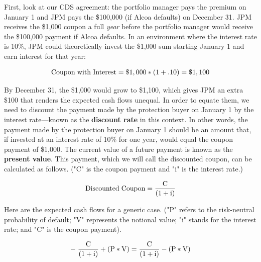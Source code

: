 \documentclass[article]{jss}
\begin{document}
First, look at our CDS agreement: the portfolio manager pays the premium on January 1 and JPM pays the \$100,000 (if Alcoa defaults) on December 31. JPM receives the \$1,000 coupon a full \emph{year} before the portfolio manager would receive the \$100,000 payment if Alcoa defaults. In an environment where the interest rate is 10\%, JPM could theoretically invest the \$1,000 sum starting January 1 and earn interest for that year:

\begin{equation}
 \begin{aligned}
  {\rm Coupon\hspace{3pt}with\hspace{3pt}Interest = {\$1,000}*{(1 + .10)} = \$1,100} 
    \end{aligned}
\end{equation}

By December 31, the \$1,000 would grow to \$1,100, which gives JPM an extra \$100 that renders the expected cash flows unequal. In order to equate them, we need to discount the payment made by the protection buyer on January 1 by the interest rate---known as the \textbf{discount rate} in this context. In other words, the payment made by the protection buyer on January 1 should be an amount that, if invested at an interest rate of 10\% for one year, would equal the coupon payment of \$1,000. The current value of a future payment is known as the \textbf{present value}. This payment, which we will call the discounted coupon, can be calculated as follows. ("C" is the coupon payment and "i" is the interest rate.)

\begin{equation}
 \begin{aligned}
  {\rm Discounted\hspace{3pt}Coupon = \frac{C}{(1 + i)}} 
    \end{aligned}
\end{equation}

Here are the expected cash flows for a generic case. ("P" refers to the risk-neutral probability of default; "V" represents the notional value; "i" stands for the interest rate; and "C" is the coupon payment).

\begin{equation}
 \begin{aligned}
  {\rm -\hspace{3pt}\frac{C}{(1 + i)} + (P * V) = \frac{C}{(1 + i)} - (P * V)} 
    \end{aligned}
\label{eqn:InterestRate}
\end{equation}
\end{document}
